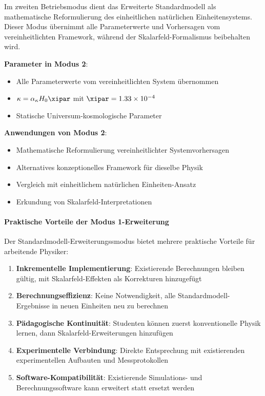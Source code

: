 	Im zweiten Betriebsmodus dient das Erweiterte Standardmodell als mathematische Reformulierung des einheitlichen natürlichen Einheitensystems. Dieser Modus übernimmt alle Parameterwerte und Vorhersagen vom vereinheitlichten Framework, während der Skalarfeld-Formalismus beibehalten wird.
	
	\textbf{Parameter in Modus 2}:
	\begin{itemize}
		\item Alle Parameterwerte vom vereinheitlichten System übernommen
		\item $\kappa = \alpha_\kappa H_0 \xipar$ mit $\xipar = 1.33 \times 10^{-4}$
		\item Statische Universum-kosmologische Parameter
	\end{itemize}
	
	\textbf{Anwendungen von Modus 2}:
	\begin{itemize}
		\item Mathematische Reformulierung vereinheitlichter Systemvorhersagen
		\item Alternatives konzeptionelles Framework für dieselbe Physik
		\item Vergleich mit einheitlichem natürlichen Einheiten-Ansatz
		\item Erkundung von Skalarfeld-Interpretationen
	\end{itemize}
	
	\paragraph{Praktische Vorteile der Modus 1-Erweiterung}
	\label{par:practical_advantages_mode1}
	
	Der Standardmodell-Erweiterungssmodus bietet mehrere praktische Vorteile für arbeitende Physiker:
	
	\begin{enumerate}
		\item \textbf{Inkrementelle Implementierung}: Existierende Berechnungen bleiben gültig, mit Skalarfeld-Effekten als Korrekturen hinzugefügt
		\item \textbf{Berechnungseffizienz}: Keine Notwendigkeit, alle Standardmodell-Ergebnisse in neuen Einheiten neu zu berechnen
		\item \textbf{Pädagogische Kontinuität}: Studenten können zuerst konventionelle Physik lernen, dann Skalarfeld-Erweiterungen hinzufügen
		\item \textbf{Experimentelle Verbindung}: Direkte Entsprechung mit existierenden experimentellen Aufbauten und Messprotokollen
		\item \textbf{Software-Kompatibilität}: Existierende Simulations- und Berechnungssoftware kann erweitert statt ersetzt werden
	\end{enumerate}
	
